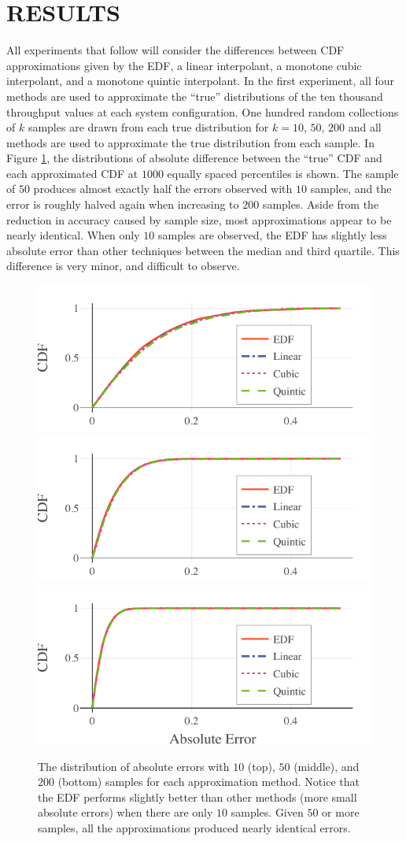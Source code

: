 \documentclass[letterpaper, 10 pt, conference]{IEEEtran}  %
\begin{document}
\section{RESULTS}
\label{sec:results}

All experiments that follow will consider the differences between CDF approximations given by the EDF, a linear interpolant, a monotone cubic interpolant, and a monotone quintic interpolant. In the first experiment, all four methods are used to approximate the ``true'' distributions of the ten thousand throughput values at each system configuration. One hundred random collections of $k$ samples are drawn from each true distribution for $k = 10$, $50$, $200$ and all methods are used to approximate the true distribution from each sample. In Figure \ref{fig:abs-error-dist}, the distributions of absolute difference between the ``true'' CDF and each approximated CDF at $1000$ equally spaced percentiles is shown. The sample of $50$ produces almost exactly half the errors observed with $10$ samples, and the error is roughly halved again when increasing to $200$ samples. Aside from the reduction in accuracy caused by sample size, most approximations appear to be nearly identical. When only $10$ samples are observed, the EDF has slightly less absolute error than other techniques between the median and third quartile. This difference is very minor, and difficult to observe.

\begin{figure}
  \vspace{-.3cm}
  \includegraphics[width=.45\textwidth]{abs-errors-10-samples.pdf}
  \includegraphics[width=.45\textwidth]{abs-errors-50-samples.pdf}
  \includegraphics[width=.45\textwidth]{abs-errors-200-samples.pdf}
  \caption{The distribution of absolute errors with $10$ (top), $50$ (middle), and $200$ (bottom) samples for each approximation method. Notice that the EDF performs slightly better than other methods (more small absolute errors) when there are only $10$ samples. Given $50$ or more samples, all the approximations produced nearly identical errors.
  \vspace{-.5cm}}
  \label{fig:abs-error-dist}
\end{figure}
\end{document}
